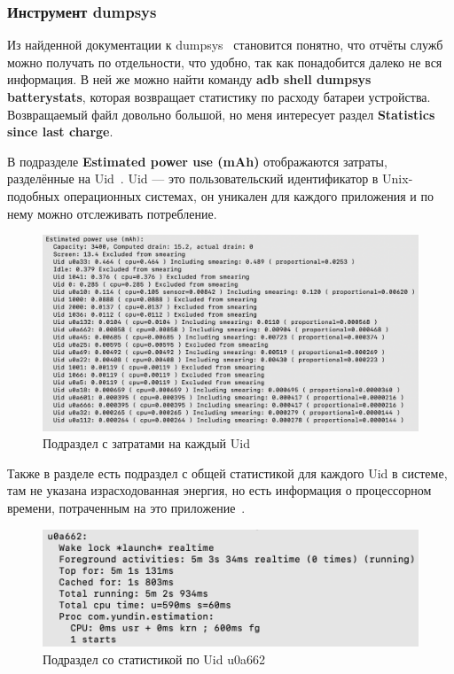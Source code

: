 \documentclass[a4paper,14pt]{extarticle} %
\begin{document}
	\subsubsection{Инструмент dumpsys} \label{subsub:dumpsys}
	
	Из найденной документации к dumpsys~\parencite{Dumpsys} становится понятно, что отчёты служб можно получать по отдельности, что удобно, так как понадобится далеко не вся информация. В ней же можно найти команду \textbf{adb shell dumpsys batterystats}, которая возвращает статистику по расходу батареи устройства. Возвращаемый файл довольно большой, но меня интересует раздел \textbf{Statistics since last charge}. 
	
	В подразделе \textbf{Estimated power use (mAh)} отображаются затраты, разделённые на Uid~\ris{\ref{fig:estimated_use}}. Uid --- это пользовательский идентификатор в Unix-подобных операционных системах, он уникален для каждого приложения и по нему можно отслеживать потребление. 
	
	\begin{figure}[!htb]
		\includegraphics[width=\textwidth]{estimated_use}
		\caption{Подраздел с затратами на каждый Uid}
		\label{fig:estimated_use}
	\end{figure}
	
	Также в разделе есть подраздел с общей статистикой для каждого Uid в системе, там не указана израсходованная энергия, но есть информация о процессорном времени, потраченным на это приложение~\ris{\ref{fig:uid_subsection}}.

	\begin{figure}[!htb]
		\includegraphics[width=\textwidth]{uid_subsection}
		\caption{Подраздел со статистикой по Uid u0a662}
		\label{fig:uid_subsection}
	\end{figure}
\end{document}
